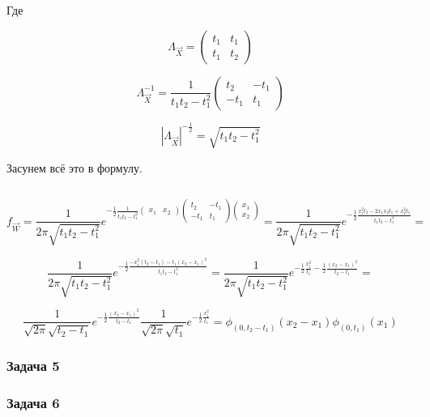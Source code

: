 \documentclass[a4paper,12pt]{article}
\begin{document}
Где 

\[ \Lambda_{\vec{X}}  = \begin{pmatrix}
t_1 & t_1 \\
t_1 & t_2
\end{pmatrix}\]

\[ \Lambda_{\vec{X}}^{-1}  = \frac{1}{t_1 t_2 - t_1^2} \begin{pmatrix}
t_2 & -t_1 \\
-t_1 & t_1
\end{pmatrix}\]

\[ |\Lambda_{\vec{X}}|^{-\frac{1}{2}} = \sqrt{t_1 t_2 - t_1^2} \]


Засунем всё это в формулу.

\[ \]

\[ f_{\vec{W}} = \frac{1}{2 \pi \sqrt{t_1 t_2 - t_1^2}} e^{-\frac{1}{2}  \frac{1}{t_1 t_2 - t_1^2} \begin{pmatrix}
	x_1 & x_2
	\end{pmatrix}
	\begin{pmatrix}
	t_2 & -t_1\\
	-t_1 & t_1
	\end{pmatrix} \begin{pmatrix}
	x_1\\
	x_2
	\end{pmatrix} }  = \frac{1}{2 \pi \sqrt{t_1 t_2 - t_1^2}} e^{-\frac{1}{2}  \frac{ x_1^2 t_2 - 2 x_1 x_2 t_1 + x_2^2 t_1 }{t_1 t_2 - t_1^2}} =  \]


\[ 
\frac{1}{2 \pi \sqrt{t_1 t_2 - t_1^2}} e^{-\frac{1}{2}  \frac{ - x_1^2(t_2 - t_1) - t_1(x_2 - x_1) ^ 2 }{t_1 t_2 - t_1^2}}  =  \frac{1}{2 \pi \sqrt{t_1 t_2 - t_1^2}} e^{  -\frac{1}{2} \frac{x_1^2}{t_1} - \frac{1}{2} \frac{(x_2 - x_1)^2}{t_2 - t_1} } = 
 \]
 
 \[ \frac{1}{\sqrt{2 \pi} \sqrt{t_2 - t_1}} e^{  - \frac{1}{2} \frac{(x_2 - x_1)^2}{t_2 - t_1} } \frac{1}{\sqrt{2 \pi} \sqrt{t_1}} e^{  -\frac{1}{2} \frac{x_1^2}{t_1}   } = \phi_{\left(0, t_{2}-t_{1}\right)}\left(x_{2}-x_{1}\right) \phi_{\left(0, t_{1}\right)}\left(x_{1}\right)
 \]
\subsubsection{Задача 5}


\subsubsection{Задача 6}
\end{document}
